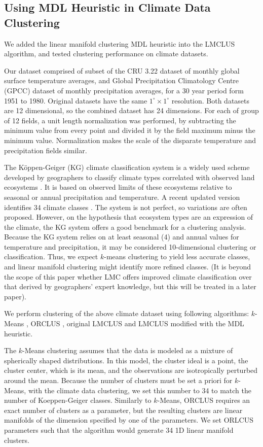 \subsection{Using MDL Heuristic in Climate Data Clustering}
\label{ssc:climate}

We added the linear manifold clustering MDL heuristic into the LMCLUS algorithm,
and tested clustering performance on climate datasets.

Our dataset comprised of subset of the CRU 3.22 dataset of monthly global
surface temperature averages, and Global Precipitation Climatology Centre
(GPCC) dataset of monthly precipitation averages, for a 30 year period form
1951 to 1980.
Original datasets have the same $1^\circ \times 1^\circ$ resolution.
Both datasets are 12 dimensional, so the combined dataset has 24 dimensions.
For each of group of 12 fields, a unit length normalization was performed,
by subtracting the minimum value from every point and divided it by the field
maximum minus the minimum value. Normalization makes the scale of the disparate
temperature and precipitation fields similar.

The K{\"o}ppen-Geiger (KG) climate classification system is a widely used scheme
developed by geographers to classify climate types correlated  with observed
land ecosystems \cite{Koppen:1936dg}. It is based on observed limits of these
ecosystems relative to seasonal or annual precipitation and temperature.
A recent updated version identifies 34 climate classes \cite{Kottek:2006wd}.
The system is not perfect, so variations are often proposed.  However, on
the hypothesis that ecosystem types are an expression of the climate,
the KG system offers a good benchmark for a clustering analysis.
{
Because the KG system relies on at least seasonal (4) and annual values for
temperature and precipitation, it may be considered 10-dimensional clustering or
classification. Thus, we expect $k$-means clustering to yield less accurate
classes, and  linear manifold clustering might identify more refined classes.
(It is beyond the scope of this paper whether LMC offers improved climate
classification over that derived by geographers' expert knowledge, but this will
be treated in a later paper).
}

We perform clustering of the above climate dataset using following algorithms:
$k$-Means \cite{Jain:1999mf}, ORCLUS \cite{Aggarwal:2000AY}, original
LMCLUS \cite{Haralick:2007rt} and LMCLUS modified with the MDL heuristic.

The $k$-Means clustering assumes that the data is modeled as a mixture of
spherically shaped distributions. In this model, the cluster ideal is a point,
the cluster center, which is its mean, and the observations are isotropically
perturbed around the mean. Because the number of clusters must be set a priori
for $k$-Means, with the climate data clustering, we set this number to 34 to
match the number of Koeppen-Geiger classes. Similarly to $k$-Means, ORCLUS
requires an exact number of clusters as a parameter, but the resulting clusters
are linear manifolds of the dimension specified by one of the parameters.
We set ORLCUS parameters such that the algorithm would generate 34 1D linear
manifold clusters.

